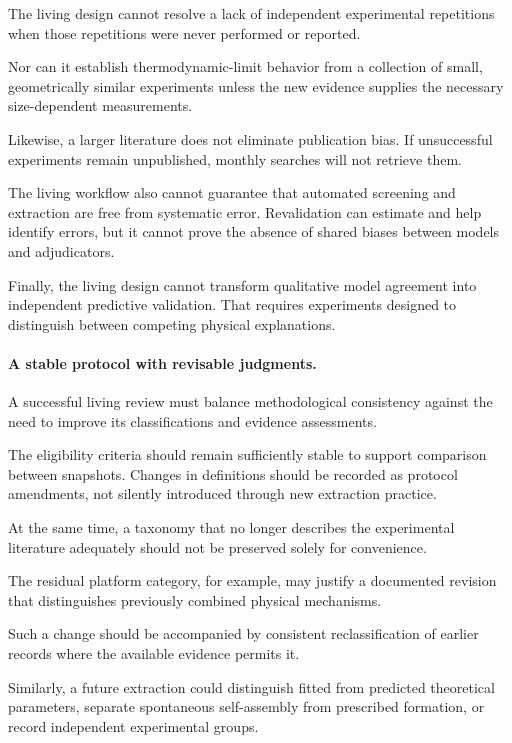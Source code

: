 The living design
cannot resolve
a lack of
independent
experimental
repetitions when
those repetitions
were never
performed or
reported.

Nor can it
establish
thermodynamic-limit
behavior from
a collection
of small,
geometrically
similar experiments
unless the new
evidence supplies
the necessary
size-dependent
measurements.

Likewise,
a larger
literature does
not eliminate
publication bias.
If unsuccessful
experiments remain
unpublished,
monthly searches
will not retrieve
them.

The living
workflow also
cannot guarantee
that automated
screening and
extraction are
free from
systematic error.
Revalidation
can estimate
and help
identify errors,
but it cannot
prove the
absence of
shared biases
between models
and adjudicators.

Finally,
the living
design cannot
transform
qualitative
model agreement
into independent
predictive validation.
That requires
experiments
designed to
distinguish
between competing
physical explanations.

\paragraph*{A stable protocol with revisable judgments.}

A successful living review
must balance methodological
consistency against the
need to improve
its classifications
and evidence assessments.

The eligibility
criteria should
remain sufficiently
stable to support
comparison between
snapshots.
Changes in
definitions should
be recorded
as protocol
amendments,
not silently
introduced through
new extraction
practice.

At the same
time, a taxonomy
that no longer
describes the
experimental
literature adequately
should not be
preserved solely
for convenience.

The residual
platform category,
for example,
may justify
a documented
revision that
distinguishes
previously
combined
physical mechanisms.

Such a change
should be accompanied
by consistent
reclassification
of earlier
records where
the available
evidence permits it.

Similarly,
a future extraction
could distinguish
fitted from
predicted
theoretical
parameters,
separate
spontaneous
self-assembly
from prescribed
formation,
or record
independent
experimental
groups.

